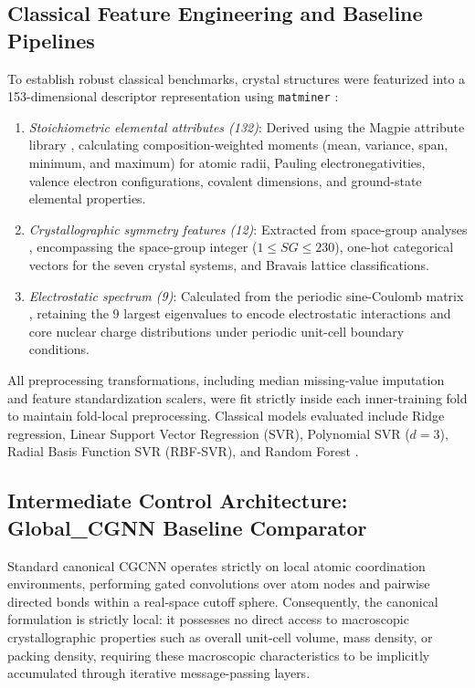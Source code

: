 \documentclass[journal,article,submit,moreauthors,pdftex]{article}
\begin{document}
\subsection{Classical Feature Engineering and Baseline Pipelines}
To establish robust classical benchmarks, crystal structures were featurized into a 153-dimensional descriptor representation using \texttt{matminer} \cite{ward2018matminer}:
\begin{enumerate}
    \item \textit{Stoichiometric elemental attributes (132)}: Derived using the Magpie attribute library \cite{ward2016general}, calculating composition-weighted moments (mean, variance, span, minimum, and maximum) for atomic radii, Pauling electronegativities, valence electron configurations, covalent dimensions, and ground-state elemental properties.
    \item \textit{Crystallographic symmetry features (12)}: Extracted from space-group analyses \cite{ong2013python}, encompassing the space-group integer ($1 \le SG \le 230$), one-hot categorical vectors for the seven crystal systems, and Bravais lattice classifications.
    \item \textit{Electrostatic spectrum (9)}: Calculated from the periodic sine-Coulomb matrix \cite{ong2013python}, retaining the 9 largest eigenvalues to encode electrostatic interactions and core nuclear charge distributions under periodic unit-cell boundary conditions.
\end{enumerate}
All preprocessing transformations, including median missing-value imputation and feature standardization scalers, were fit strictly inside each inner-training fold to maintain fold-local preprocessing. Classical models evaluated include Ridge regression, Linear Support Vector Regression (SVR), Polynomial SVR ($d=3$), Radial Basis Function SVR (RBF-SVR), and Random Forest \cite{pedregosa2011scikit}.

\subsection{Intermediate Control Architecture: Global\_CGNN Baseline Comparator}
Standard canonical CGCNN \cite{xie2018crystal} operates strictly on local atomic coordination environments, performing gated convolutions over atom nodes and pairwise directed bonds within a real-space cutoff sphere. Consequently, the canonical formulation is strictly local: it possesses no direct access to macroscopic crystallographic properties such as overall unit-cell volume, mass density, or packing density, requiring these macroscopic characteristics to be implicitly accumulated through iterative message-passing layers.
\end{document}
